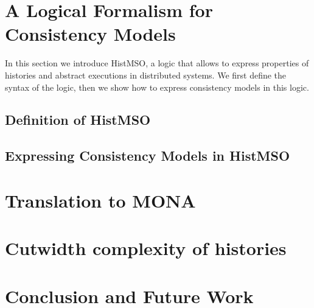 \documentclass[runningheads]{llncs}
\begin{document}
\section{A Logical Formalism for Consistency Models\label{sec:histmso}}
In this section we introduce HistMSO, a logic that allows to express properties of 
histories and abstract executions in distributed systems. 
We first define the syntax of the logic, then we show how to express consistency models in this logic.
\subsection{Definition of HistMSO\label{sec:definition-logic}}

\subsection{Expressing Consistency Models in HistMSO}


\section{Translation to MONA\label{sec:translation-to-mona}}



\section{Cutwidth complexity of histories\label{sec:cutwidth}}


\section{Conclusion and Future Work}

\end{document}
